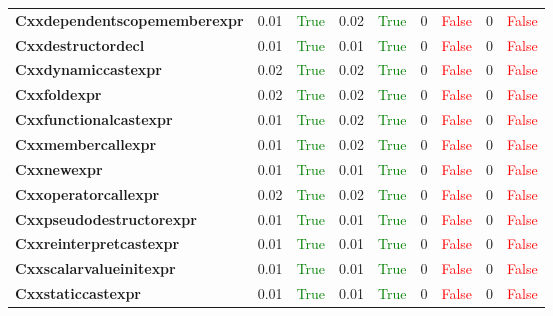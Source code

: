 \documentclass{article}
\begin{document}
\begin{xltabular}{\textwidth}{lcccccccc}
\textbf{{\fontsize{10}{12}\selectfont Cxxdependentscopememberexpr}}& 0.01&\textcolor{green}{True}& 0.02&\textcolor{green}{True}& 0&\textcolor{red}{False}& 0&\textcolor{red}{False} \\[0.5ex]
\textbf{{\fontsize{10}{12}\selectfont Cxxdestructordecl}}& 0.01&\textcolor{green}{True}& 0.01&\textcolor{green}{True}& 0&\textcolor{red}{False}& 0&\textcolor{red}{False} \\[0.5ex]
\textbf{{\fontsize{10}{12}\selectfont Cxxdynamiccastexpr}}& 0.02&\textcolor{green}{True}& 0.02&\textcolor{green}{True}& 0&\textcolor{red}{False}& 0&\textcolor{red}{False} \\[0.5ex]
\textbf{{\fontsize{10}{12}\selectfont Cxxfoldexpr}}& 0.02&\textcolor{green}{True}& 0.02&\textcolor{green}{True}& 0&\textcolor{red}{False}& 0&\textcolor{red}{False} \\[0.5ex]
\textbf{{\fontsize{10}{12}\selectfont Cxxfunctionalcastexpr}}& 0.01&\textcolor{green}{True}& 0.02&\textcolor{green}{True}& 0&\textcolor{red}{False}& 0&\textcolor{red}{False} \\[0.5ex]
\textbf{{\fontsize{10}{12}\selectfont Cxxmembercallexpr}}& 0.01&\textcolor{green}{True}& 0.02&\textcolor{green}{True}& 0&\textcolor{red}{False}& 0&\textcolor{red}{False} \\[0.5ex]
\textbf{{\fontsize{10}{12}\selectfont Cxxnewexpr}}& 0.01&\textcolor{green}{True}& 0.01&\textcolor{green}{True}& 0&\textcolor{red}{False}& 0&\textcolor{red}{False} \\[0.5ex]
\textbf{{\fontsize{10}{12}\selectfont Cxxoperatorcallexpr}}& 0.02&\textcolor{green}{True}& 0.02&\textcolor{green}{True}& 0&\textcolor{red}{False}& 0&\textcolor{red}{False} \\[0.5ex]
\textbf{{\fontsize{10}{12}\selectfont Cxxpseudodestructorexpr}}& 0.01&\textcolor{green}{True}& 0.01&\textcolor{green}{True}& 0&\textcolor{red}{False}& 0&\textcolor{red}{False} \\[0.5ex]
\textbf{{\fontsize{10}{12}\selectfont Cxxreinterpretcastexpr}}& 0.01&\textcolor{green}{True}& 0.01&\textcolor{green}{True}& 0&\textcolor{red}{False}& 0&\textcolor{red}{False} \\[0.5ex]
\textbf{{\fontsize{10}{12}\selectfont Cxxscalarvalueinitexpr}}& 0.01&\textcolor{green}{True}& 0.01&\textcolor{green}{True}& 0&\textcolor{red}{False}& 0&\textcolor{red}{False} \\[0.5ex]
\textbf{{\fontsize{10}{12}\selectfont Cxxstaticcastexpr}}& 0.01&\textcolor{green}{True}& 0.01&\textcolor{green}{True}& 0&\textcolor{red}{False}& 0&\textcolor{red}{False} \\[0.5ex]

\end{xltabular}
\end{document}
